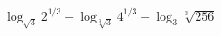 \begin{ex}[type=calculate]
	\begin{condition}
		\( \log_{\sqrt{3}}2^{1/3}+\log_{\sqrt[3]{3}}4^{1/3}-\log_3\sqrt[3]{256} \)
	\end{condition}
\end{ex}